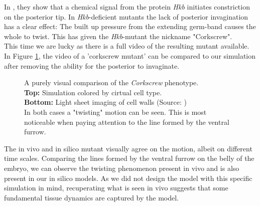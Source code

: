 In , they show that a chemical signal from the protein \textit{Hkb} initiates constriction on the posterior tip. In \textit{Hkb}-deficient mutants the lack of posterior invagination has a clear effect: The built up pressure from the extending germ-band causes the whole to twist. This has given the \textit{Hkb}-mutant the nickname "Corkscrew".\\

This time we are lucky as there is a full video of the resulting mutant available. In Figure \ref{fig:corkscrew-comparison}, the video of a 'corkscrew mutant' can be compared to our simulation after removing the ability for the posterior to invaginate.

 
\begin{figure}[H]
    \centering
    \caption{A purely visual comparison of the \textit{Corkscrew} phenotype.\\
    \textbf{Top:} Simulation colored by cirtual cell type. \\
    \textbf{Bottom:} Light sheet imaging of cell walls (Source: )\\ In both cases  a "twisting" motion can be seen. This is most noticeable when paying attention to the line formed by the ventral furrow.}
    \label{fig:corkscrew-comparison}
\end{figure}

The in vivo and in silico mutant visually agree on the motion, albeit on different time scales. Comparing the lines formed by the ventral furrow on the belly of the embryo, we can observe the twisting phenomenon present in vivo and is also present in our in silico models. As we did not design the model with this specific simulation in mind, recuperating what is seen in vivo suggests that some fundamental tissue dynamics are captured by the model. \\


